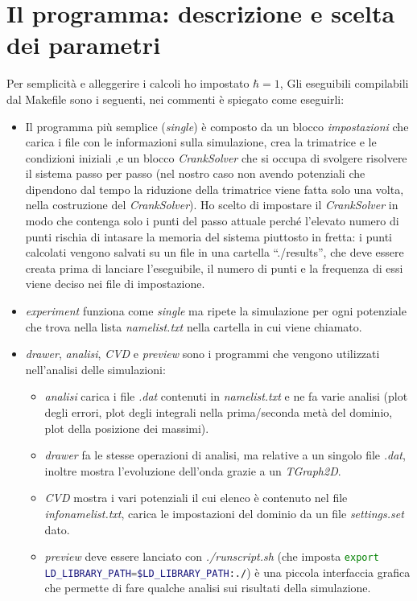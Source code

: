 \section{Il programma: descrizione e scelta dei parametri}
Per semplicit\`a e alleggerire i calcoli ho impostato $\hbar=1$, 
Gli eseguibili compilabili dal Makefile sono i seguenti, nei commenti \`e spiegato come eseguirli:

\begin{itemize}
\item Il programma pi\`u semplice (\textit{single}) \`e composto da un blocco \textit{impostazioni} che carica i file con le informazioni sulla simulazione, crea la trimatrice e le condizioni iniziali ,e un blocco \textit{CrankSolver} che si occupa di svolgere risolvere il sistema passo per passo (nel nostro caso non avendo potenziali che dipendono dal tempo la riduzione della trimatrice viene fatta solo una volta, nella costruzione del \textit{CrankSolver}).
  Ho scelto di impostare il \textit{CrankSolver} in modo che contenga solo i punti del passo attuale perch\'e l'elevato numero di punti rischia di intasare la memoria del sistema piuttosto in fretta: i punti calcolati vengono salvati su un file in una cartella ``./results'', che deve essere creata prima di lanciare l'eseguibile, il numero di punti e la frequenza di essi viene deciso nei file di impostazione.
\item \textit{experiment} funziona come \textit{single} ma ripete la simulazione per ogni potenziale che trova nella lista \textit{namelist.txt} nella cartella in cui viene chiamato.
\item \textit{drawer}, \textit{analisi}, \textit{CVD} e \textit{preview} sono i programmi che vengono utilizzati nell'analisi delle simulazioni:
  \begin{itemize}
  \item \textit{analisi} carica i file  \textit{.dat} contenuti in \textit{namelist.txt} e ne fa varie analisi (plot degli errori, plot degli integrali nella prima/seconda met\`a del dominio, plot della posizione dei massimi).
  \item \textit{drawer} fa le stesse operazioni di analisi, ma relative a un singolo file \textit{.dat}, inoltre mostra l'evoluzione dell'onda grazie a un \textit{TGraph2D}.
  \item \textit{CVD} mostra i vari potenziali il cui elenco \`e contenuto nel file \textit{infonamelist.txt}, carica le impostazioni del dominio da un file \textit{settings.set} dato.
  \item \textit{preview} deve essere lanciato con \textit{./runscript.sh} (che imposta \lstinline[language = bash]|export LD_LIBRARY_PATH=$LD_LIBRARY_PATH:./|) \`e una piccola interfaccia grafica che permette di fare qualche analisi sui risultati della simulazione.
  \end{itemize}
\end{itemize}
